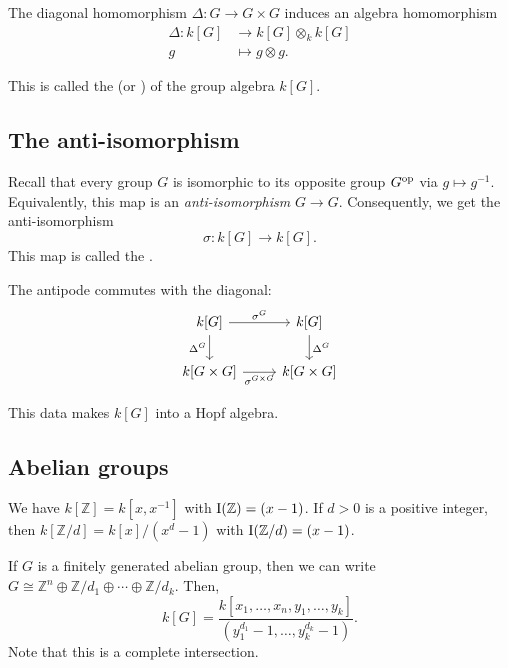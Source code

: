 \documentclass[12pt]{article}
\begin{document}
The diagonal homomorphism $\Delta \colon G \to G \times G$ induces an algebra homomorphism
\begin{align*} 
	\Delta \colon k[G] &\to k[G] \otimes_{k} k[G] \\
	g &\mapsto g \otimes g.
\end{align*}

This is called the  (or ) of the group algebra $k[G]$.

\subsection{The anti-isomorphism}

Recall that every group $G$ is isomorphic to its opposite group $G^{\operatorname{op}}$ via $g \mapsto g^{-1}$. 
Equivalently, this map is an \emph{anti-isomorphism} $G \to G$. 
Consequently, we get the anti-isomorphism 
\begin{equation*} 
	\sigma \colon k[G] \to k[G].
\end{equation*}
This map is called the .

The antipode commutes with the diagonal:
\begin{equation*} 
	\begin{tikzcd}
		k[G] \arrow[r, "\sigma^{G}"] \arrow[d, "\Delta^{G}"'] & k[G] \arrow[d, "\Delta^{G}"] \\
		k[G \times G] \arrow[r, "\sigma^{G \times G}"'] & k[G \times G]
	\end{tikzcd}
\end{equation*}

This data makes $k[G]$ into a Hopf algebra.

\subsection{Abelian groups}

We have $k[\mathbb{Z}] = k[x, x^{-1}]$ with $\operatorname{I}(\mathbb{Z}) = (x - 1)$. \newline
If $d > 0$ is a positive integer, then
$k[\mathbb{Z}/d] = k[x]/(x^{d} - 1)$ with $\operatorname{I}(\mathbb{Z}/d) = (x - 1)$.

If $G$ is a finitely generated abelian group, then we can write $G \cong \mathbb{Z}^{n} \oplus \mathbb{Z}/d_{1} \oplus \cdots \oplus \mathbb{Z}/d_{k}$. 
Then,
\begin{equation*} 
	k[G] = \frac{k[x_{1}, \ldots, x_{n}, y_{1}, \ldots, y_{k}]}{(y_{1}^{d_{1}} - 1, \ldots, y_{k}^{d_{k}} - 1)}.
\end{equation*}
Note that this is a complete intersection.
\end{document}

